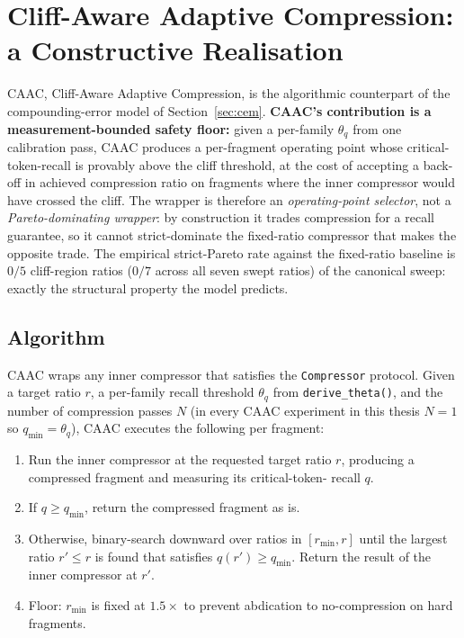 \section{Cliff-Aware Adaptive Compression: a Constructive Realisation}
\label{sec:caac}
CAAC, Cliff-Aware Adaptive Compression, is the algorithmic
counterpart of the compounding-error model of
Section~\ref{sec:cem}. \textbf{CAAC's contribution is a
measurement-bounded safety floor:} given a per-family
$\theta_q$ from one calibration pass, CAAC produces a per-fragment
operating point whose critical-token-recall is provably above the
cliff threshold, at the cost of accepting a back-off in achieved
compression ratio on fragments where the inner compressor would
have crossed the cliff. The wrapper is therefore an
\emph{operating-point selector}, not a \emph{Pareto-dominating
wrapper}: by construction it trades compression for a recall
guarantee, so it cannot strict-dominate the fixed-ratio compressor
that makes the opposite trade. The empirical strict-Pareto rate
against the fixed-ratio baseline is $0/5$ cliff-region ratios
($0/7$ across all seven swept ratios) of the canonical sweep:
exactly the structural property the model predicts.

\subsection{Algorithm}
\label{sec:caac_algo}

CAAC wraps any inner compressor that satisfies the
\texttt{Compressor} protocol. Given a target ratio $r$, a
per-family recall threshold $\theta_q$ from
\texttt{derive\_theta()}, and the number of compression passes
$N$ (in every CAAC experiment in this thesis $N=1$ so
$q_\text{min} = \theta_q$), CAAC executes the following per
fragment:

\begin{enumerate}\setlength\itemsep{1pt}
\item Run the inner compressor at the requested target ratio $r$,
producing a compressed fragment and measuring its critical-token-%
recall $q$.
\item If $q \ge q_\text{min}$, return the compressed fragment as
is.
\item Otherwise, binary-search downward over ratios in
$[r_\text{min}, r]$ until the largest ratio $r' \le r$ is found
that satisfies $q(r') \ge q_\text{min}$. Return the result of the
inner compressor at $r'$.
\item Floor: $r_\text{min}$ is fixed at $1.5\times$ to prevent
abdication to no-compression on hard fragments.
\end{enumerate}

